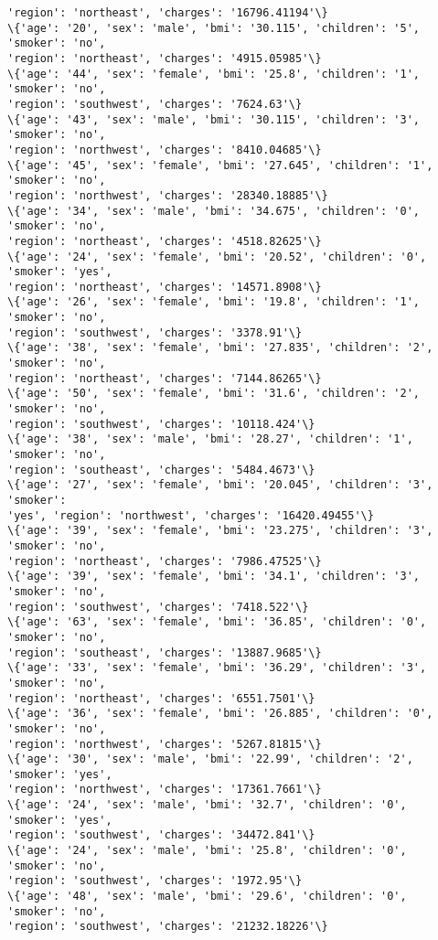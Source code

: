 \documentclass[11pt]{article}
\begin{document}
\begin{Verbatim}[commandchars=\\\{\}]
'region': 'northeast', 'charges': '16796.41194'\}
\{'age': '20', 'sex': 'male', 'bmi': '30.115', 'children': '5', 'smoker': 'no',
'region': 'northeast', 'charges': '4915.05985'\}
\{'age': '44', 'sex': 'female', 'bmi': '25.8', 'children': '1', 'smoker': 'no',
'region': 'southwest', 'charges': '7624.63'\}
\{'age': '43', 'sex': 'male', 'bmi': '30.115', 'children': '3', 'smoker': 'no',
'region': 'northwest', 'charges': '8410.04685'\}
\{'age': '45', 'sex': 'female', 'bmi': '27.645', 'children': '1', 'smoker': 'no',
'region': 'northwest', 'charges': '28340.18885'\}
\{'age': '34', 'sex': 'male', 'bmi': '34.675', 'children': '0', 'smoker': 'no',
'region': 'northeast', 'charges': '4518.82625'\}
\{'age': '24', 'sex': 'female', 'bmi': '20.52', 'children': '0', 'smoker': 'yes',
'region': 'northeast', 'charges': '14571.8908'\}
\{'age': '26', 'sex': 'female', 'bmi': '19.8', 'children': '1', 'smoker': 'no',
'region': 'southwest', 'charges': '3378.91'\}
\{'age': '38', 'sex': 'female', 'bmi': '27.835', 'children': '2', 'smoker': 'no',
'region': 'northeast', 'charges': '7144.86265'\}
\{'age': '50', 'sex': 'female', 'bmi': '31.6', 'children': '2', 'smoker': 'no',
'region': 'southwest', 'charges': '10118.424'\}
\{'age': '38', 'sex': 'male', 'bmi': '28.27', 'children': '1', 'smoker': 'no',
'region': 'southeast', 'charges': '5484.4673'\}
\{'age': '27', 'sex': 'female', 'bmi': '20.045', 'children': '3', 'smoker':
'yes', 'region': 'northwest', 'charges': '16420.49455'\}
\{'age': '39', 'sex': 'female', 'bmi': '23.275', 'children': '3', 'smoker': 'no',
'region': 'northeast', 'charges': '7986.47525'\}
\{'age': '39', 'sex': 'female', 'bmi': '34.1', 'children': '3', 'smoker': 'no',
'region': 'southwest', 'charges': '7418.522'\}
\{'age': '63', 'sex': 'female', 'bmi': '36.85', 'children': '0', 'smoker': 'no',
'region': 'southeast', 'charges': '13887.9685'\}
\{'age': '33', 'sex': 'female', 'bmi': '36.29', 'children': '3', 'smoker': 'no',
'region': 'northeast', 'charges': '6551.7501'\}
\{'age': '36', 'sex': 'female', 'bmi': '26.885', 'children': '0', 'smoker': 'no',
'region': 'northwest', 'charges': '5267.81815'\}
\{'age': '30', 'sex': 'male', 'bmi': '22.99', 'children': '2', 'smoker': 'yes',
'region': 'northwest', 'charges': '17361.7661'\}
\{'age': '24', 'sex': 'male', 'bmi': '32.7', 'children': '0', 'smoker': 'yes',
'region': 'southwest', 'charges': '34472.841'\}
\{'age': '24', 'sex': 'male', 'bmi': '25.8', 'children': '0', 'smoker': 'no',
'region': 'southwest', 'charges': '1972.95'\}
\{'age': '48', 'sex': 'male', 'bmi': '29.6', 'children': '0', 'smoker': 'no',
'region': 'southwest', 'charges': '21232.18226'\}

\end{Verbatim}
\end{document}
